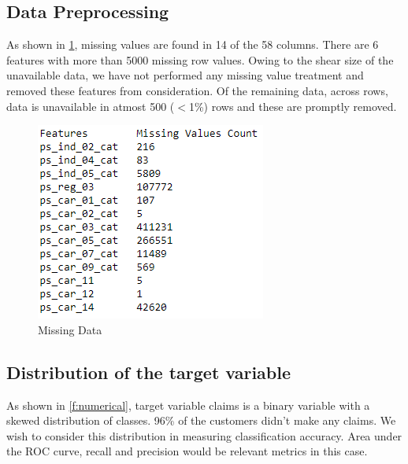 \subsection{Data Preprocessing}
As shown in \ref{f:missing}, missing values are found in 14 of the 58 columns. There are 6 features with more than 5000 missing row values. Owing to the shear size of the unavailable data, we have not performed any missing value treatment and removed these features from consideration. Of the remaining data, across rows, data is unavailable in atmost 500 ($<$1\%) rows and these are promptly removed.

\begin{figure}[!ht]
  \centering\includegraphics[width=\columnwidth]{images/missingdata.PNG}
  \caption{Missing Data}\label{f:missing}
\end{figure}

\subsection{Distribution of the target variable}
As shown in \ref{f:numerical}, target variable claims is a binary variable with a skewed distribution of classes. 96\% of the customers didn't make any claims. We wish to consider this distribution in measuring classification accuracy. Area under the ROC curve, recall and precision would be relevant metrics in this case.
 
